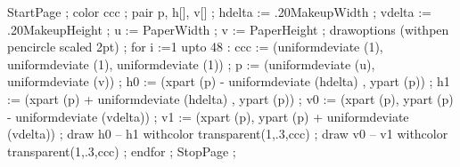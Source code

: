 \usemodule[simpleslides][style=HorizontalStripes,color=green,size=16pt]

\setupexternalfigures[directory={./common}]

StartPage ;
color ccc ;
pair p, h[], v[] ;
hdelta := .20MakeupWidth ; vdelta := .20MakeupHeight ;
u := PaperWidth ; v := PaperHeight ;
drawoptions (withpen pencircle scaled 2pt) ;
for i :=1 upto 48 :
    ccc := (uniformdeviate (1), uniformdeviate (1), uniformdeviate (1)) ;
    p := (uniformdeviate (u), uniformdeviate (v)) ;
    h0 := (xpart (p) - uniformdeviate (hdelta) , ypart (p)) ;
    h1 := (xpart (p) + uniformdeviate (hdelta) , ypart (p)) ;
    v0 := (xpart (p), ypart (p) - uniformdeviate (vdelta)) ;
    v1 := (xpart (p), ypart (p) + uniformdeviate (vdelta)) ;
    draw h0 -- h1 withcolor transparent(1,.3,ccc) ;
    draw v0 -- v1 withcolor transparent(1,.3,ccc) ;
endfor ;
StopPage ;
\stopuseMPgraphic












